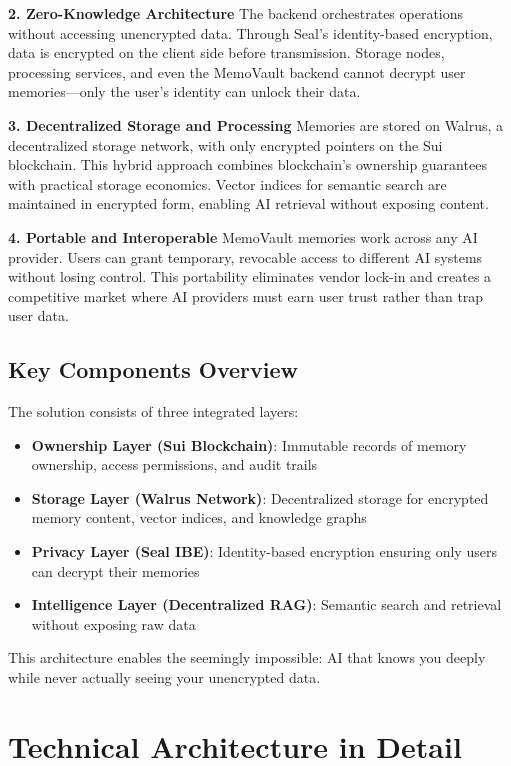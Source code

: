\documentclass[12pt, a4paper]{article}
\begin{document}
\textbf{2. Zero-Knowledge Architecture}  
The backend orchestrates operations without accessing unencrypted data. Through Seal's identity-based encryption, data is encrypted on the client side before transmission. Storage nodes, processing services, and even the MemoVault backend cannot decrypt user memories—only the user's identity can unlock their data.

\textbf{3. Decentralized Storage and Processing}
Memories are stored on Walrus, a decentralized storage network, with only encrypted pointers on the Sui blockchain. This hybrid approach combines blockchain's ownership guarantees with practical storage economics. Vector indices for semantic search are maintained in encrypted form, enabling AI retrieval without exposing content.

\textbf{4. Portable and Interoperable}
MemoVault memories work across any AI provider. Users can grant temporary, revocable access to different AI systems without losing control. This portability eliminates vendor lock-in and creates a competitive market where AI providers must earn user trust rather than trap user data.

\subsection{Key Components Overview}

The solution consists of three integrated layers:

\begin{itemize}
    \item \textbf{Ownership Layer (Sui Blockchain)}: Immutable records of memory ownership, access permissions, and audit trails
    \item \textbf{Storage Layer (Walrus Network)}: Decentralized storage for encrypted memory content, vector indices, and knowledge graphs  
    \item \textbf{Privacy Layer (Seal IBE)}: Identity-based encryption ensuring only users can decrypt their memories
    \item \textbf{Intelligence Layer (Decentralized RAG)}: Semantic search and retrieval without exposing raw data
\end{itemize}

This architecture enables the seemingly impossible: AI that knows you deeply while never actually seeing your unencrypted data.

\section{Technical Architecture in Detail}
\end{document}
